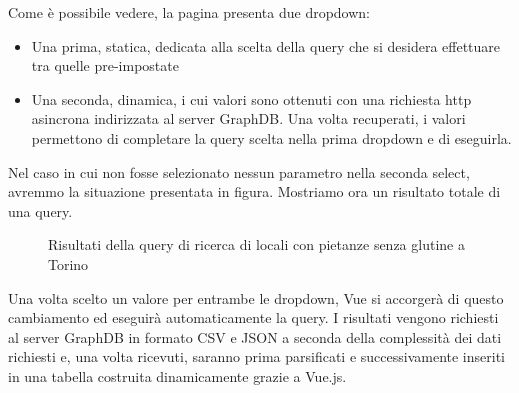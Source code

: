 \documentclass[12pt]{article}
\begin{document}
Come è possibile vedere, la pagina presenta due dropdown:
\begin{itemize}
    \item Una prima, statica, dedicata alla scelta della query che si desidera effettuare tra quelle pre-impostate
    \item Una seconda, dinamica, i cui valori sono ottenuti con una richiesta http asincrona indirizzata al server GraphDB. Una volta recuperati, i valori permettono di completare la query scelta nella prima dropdown e di eseguirla.
\end{itemize}
Nel caso in cui non fosse selezionato nessun parametro nella seconda select, avremmo la situazione presentata in figura. Mostriamo ora un risultato totale di una query.
\begin{figure}[H]
    \caption{Risultati della query di ricerca di locali con pietanze senza glutine a Torino}
\end{figure}
Una volta scelto un valore per entrambe le dropdown, Vue si accorgerà di questo cambiamento ed eseguirà automaticamente la query. I risultati vengono richiesti al server GraphDB in formato CSV e JSON a seconda della complessità dei dati richiesti e, una volta ricevuti, saranno prima parsificati e successivamente inseriti in una tabella costruita dinamicamente grazie a Vue.js.
\end{document}
